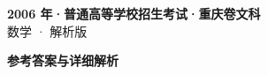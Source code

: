 \documentclass[zihao=-4, a4paper]{ctexart}
\begin{document}
\begin{center}
  {\Large\bfseries 2006 年·普通高等学校招生考试·重庆卷文科}\\[4pt]
  {\large 数学 · 解析版}
\end{center}
\medskip
{}

\clearpage
{}
\begin{center}{\Large\bfseries 参考答案与详细解析}\end{center}
\medskip

\end{document}
